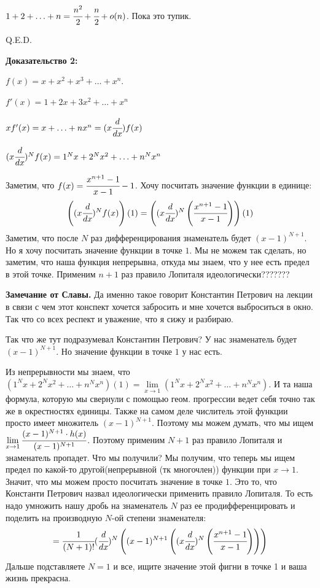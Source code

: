 $1 + 2 + \ldots + n = \cfrac{n^2}{2} + \cfrac{n}{2} + o(n)$. Пока это тупик.

\hfill Q.E.D.

\textbf{Доказательство 2:}

$f(x) = x + x^2 + x^3 +\ldots + x^n$.

$f'(x) = 1 + 2x + 3x^2 + \ldots +x^n$

$xf'(x) = x + \ldots + nx^n  = (x\cfrac{d}{dx})f(x)$

$(x\cfrac{d}{dx})^Nf(x) = 1^Nx +2^Nx^2 +\ldots +n^Nx^n $

Заметим, что $f(x) = \cfrac{x^{n+1}-1}{x-1}-1$. Хочу посчитать значение функции в единице:
$$\left((x\cfrac{d}{dx})^Nf(x)\right)(1) =\left((x\cfrac{d}{dx})^N \left(\cfrac{x^{n+1}-1}{x-1}\right)\right)(1)$$
Заметим, что после $N$ раз дифференцирования знаменатель будет $(x-1)^{N+1}$. Но я хочу посчитать значение функции в точке $1$. Мы не можем так сделать, но заметим, что наша функция непрерывна, откуда мы знаем, что у нее есть предел  в этой точке. Применим $n+1$ раз правило Лопиталя идеологически??????? 

\textbf{Замечание от Славы. }Да именно такое говорит Константин Петрович на лекции в связи  с чем этот конспект хочется забросить и мне хочется выброситься в окно.  Так что со всех респект и уважение, что я сижу и разбираю.

Так что же тут подразумевал Константин Петрович? У нас  знаменатель будет $(x-1)^{N+1}$. Но значение функции в точке $1$ у нас есть. 

Из непрерывности мы знаем, что $(1^Nx +2^Nx^2 +\ldots +n^Nx^n)(1) = \lim\limits_{x \rightarrow 1} (1^Nx +2^Nx^2 +\ldots +n^Nx^n)$. И та наша формула, которую мы свернули с помощью геом. прогрессии ведет себя точно так же в окрестностях единицы. Также на самом деле числитель этой функции просто имеет множитель $(x-1)^{N+1}$. Поэтому мы можем думать, что мы ищем $\lim\limits_{x\rightarrow1} \cfrac{(x-1)^{N+1}\cdot h(x)}{(x-1)^{N+1}}$. Поэтому применим ${N+1}$ раз правило Лопиталя и знаменатель пропадет. Что мы получили? Мы получим, что теперь мы ищем предел по какой-то другой(непрерывной (тк многочлен)) функции при $x\rightarrow 1$. Значит, что мы можем просто посчитать значение в точке $1    $. Это то, что Константи Петрович назвал идеологически применить правило Лопиталя. То есть надо умножить нашу дробь на знаменатель $N$ раз ее продифференцировать и поделить на производную $N$-ой степени знаменателя:
$$= \cfrac{1}{(N+1)!}(\cfrac{d}{dx})^N\left((x-1)^{N+1}\left((x\cfrac{d}{dx})^N \left(\cfrac{x^{n+1}-1}{x-1}\right)\right)\right)$$
Дальше подставляете $N=1$ и все, ищите значение этой фигни в точке 1 и ваша жизнь прекрасна.

